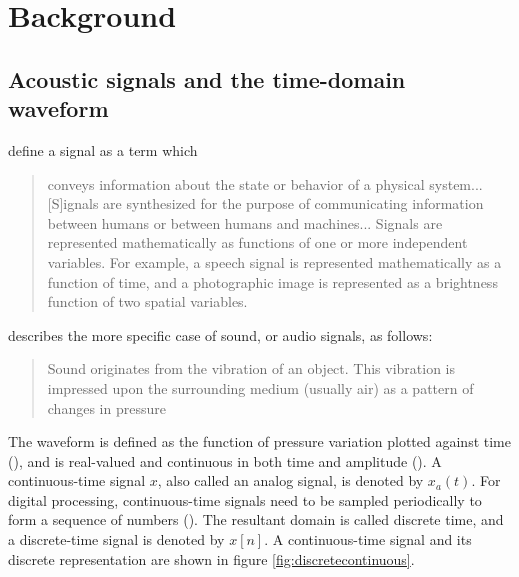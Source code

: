 \documentclass[report.tex]{subfiles}
\begin{document}
\section{Background}
\label{sec:background}

\subsection{Acoustic signals and the time-domain waveform}
\label{sec:timedomain}

\textcite[Chapter~2]{discretebook} define a signal as a term which

\begin{quote}
	conveys information about the state or behavior of a physical system... [S]ignals are synthesized for the purpose of communicating information between humans or between humans and machines... Signals are represented mathematically as functions of one or more independent variables. For example, a speech signal is represented mathematically as a function of time, and a photographic image is represented as a brightness function of two spatial variables.
\end{quote}

\textcite[Chapter~2]{moore} describes the more specific case of sound, or audio signals, as follows:

\begin{quote}
	Sound originates from the vibration of an object. This vibration is impressed upon the surrounding medium (usually air) as a pattern of changes in pressure
\end{quote}

The waveform is defined as the function of pressure variation plotted against time (\cite{moore, melbook}), and is real-valued and continuous in both time and amplitude (\cite[Chapter~2]{melbook}). A continuous-time signal $x$, also called an analog signal, is denoted by $x_{a}(t)$. For digital processing, continuous-time signals need to be sampled periodically to form a sequence of numbers (\cite[Chapter~2]{discretebook}). The resultant domain is called discrete time, and a discrete-time signal is denoted by $x[n]$.  A continuous-time signal and its discrete representation are shown in figure \ref{fig:discretecontinuous}.
\end{document}
